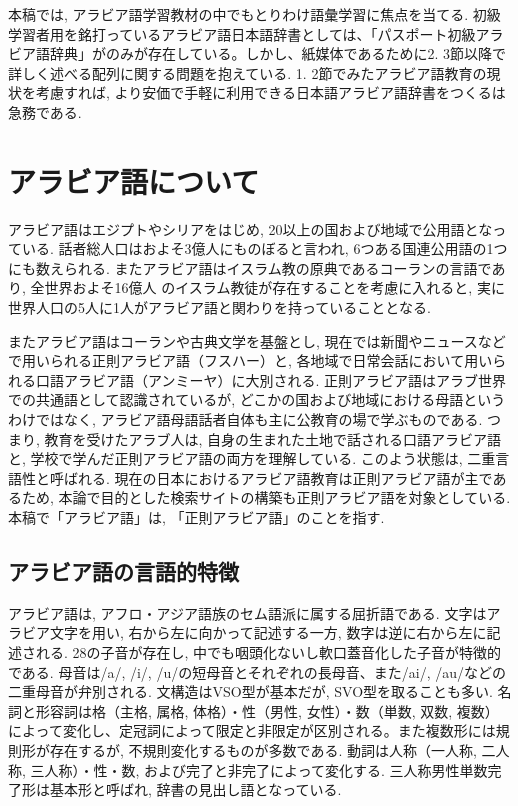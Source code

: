 \documentclass[technicalreport]{ieicej}
\begin{document}
本稿では, アラビア語学習教材の中でもとりわけ語彙学習に焦点を当てる. 初級学習者用を銘打っているアラビア語日本語辞書としては、「パスポート初級アラビア語辞典」がのみが存在している。しかし、紙媒体であるために2. 3節以降で詳しく述べる配列に関する問題を抱えている.
1. 2節でみたアラビア語教育の現状を考慮すれば, より安価で手軽に利用できる日本語アラビア語辞書をつくるは急務である. 

\section{アラビア語について}
アラビア語はエジプトやシリアをはじめ, 20以上の国および地域で公用語となっている. 話者総人口はおよそ3億人にものぼると言われ, 6つある国連公用語の1つにも数えられる. またアラビア語はイスラム教の原典であるコーランの言語であり, 全世界およそ16億人 のイスラム教徒が存在することを考慮に入れると, 実に世界人口の5人に1人がアラビア語と関わりを持っていることとなる. 

またアラビア語はコーランや古典文学を基盤とし, 現在では新聞やニュースなどで用いられる正則アラビア語（フスハー）と, 各地域で日常会話において用いられる口語アラビア語（アンミーヤ）に大別される. 正則アラビア語はアラブ世界での共通語として認識されているが, どこかの国および地域における母語というわけではなく, アラビア語母語話者自体も主に公教育の場で学ぶものである. つまり, 教育を受けたアラブ人は, 自身の生まれた土地で話される口語アラビア語と, 学校で学んだ正則アラビア語の両方を理解している. このよう状態は, 二重言語性と呼ばれる. 現在の日本におけるアラビア語教育は正則アラビア語が主であるため, 本論で目的とした検索サイトの構築も正則アラビア語を対象としている. 本稿で「アラビア語」は, 「正則アラビア語」のことを指す. 

\subsection{アラビア語の言語的特徴}
アラビア語は, アフロ・アジア語族のセム語派に属する屈折語である. 文字はアラビア文字を用い, 右から左に向かって記述する一方, 数字は逆に右から左に記述される. 28の子音が存在し, 中でも咽頭化ないし軟口蓋音化した子音が特徴的である. 母音は/a/, /i/, /u/の短母音とそれぞれの長母音、また/ai/, /au/などの二重母音が弁別される. 文構造はVSO型が基本だが, SVO型を取ることも多い. 名詞と形容詞は格（主格, 属格, 体格）・性（男性, 女性）・数（単数, 双数, 複数）によって変化し、定冠詞によって限定と非限定が区別される。また複数形には規則形が存在するが, 不規則変化するものが多数である. 動詞は人称（一人称, 二人称, 三人称）・性・数, および完了と非完了によって変化する. 三人称男性単数完了形は基本形と呼ばれ, 辞書の見出し語となっている.
\end{document}
